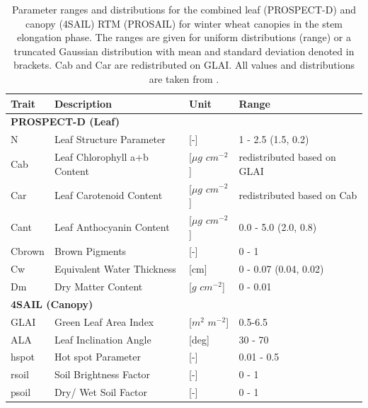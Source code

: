 \begin{table}[H]
\centering
\caption{Parameter ranges and distributions for the combined leaf (PROSPECT-D) and canopy (4SAIL) \gls{RTM} (PROSAIL) for winter wheat canopies in the stem elongation phase. The ranges are given for uniform distributions (range) or a truncated Gaussian distribution with mean and standard deviation denoted in brackets. Cab and Car are redistributed on \gls{GLAI}. All values and distributions are taken from \cite{graf_insights_2023}.}
\label{tab:drc-prosail-inputs}
\begin{tabular}{@{}lllllll@{}}
\toprule
  \textbf{Trait}     & \textbf{Description}         & \textbf{Unit}           & \multicolumn{4}{l}{\textbf{Range}}              \\ \midrule
\multicolumn{7}{l}{\textbf{PROSPECT-D (Leaf)}}                                                                \\
\midrule
N      & Leaf Structure Parameter     & {[}-{]}                 & \multicolumn{4}{l}{1 - 2.5 (1.5, 0.2)}          \\
Cab    & Leaf Chlorophyll a+b Content & {[}$\mu g$ $cm^{-2}${]} & \multicolumn{4}{l}{redistributed based on GLAI} \\
Car    & Leaf Carotenoid Content      & {[}$\mu g$ $cm^{-2}${]} & \multicolumn{4}{l}{redistributed based on Cab}  \\
Cant   & Leaf Anthocyanin Content     & {[}$\mu g$ $cm^{-2}${]} & \multicolumn{4}{l}{0.0 - 5.0 (2.0, 0.8)}        \\
Cbrown & Brown Pigments               & {[}-{]}                 & \multicolumn{4}{l}{0 - 1}                       \\
Cw     & Equivalent Water Thickness   & {[}cm{]}                & \multicolumn{4}{l}{0 - 0.07 (0.04, 0.02)}       \\
Dm     & Dry Matter Content           & {[}$g$ $cm^{-2}${]}     & \multicolumn{4}{l}{0 - 0.01}                    \\
\midrule
\multicolumn{7}{l}{\textbf{4SAIL (Canopy)}}                                                                     \\
\midrule
GLAI   & Green Leaf Area Index        & {[}$m^2$ $m^{-2}${]}    & \multicolumn{4}{l}{0.5-6.5}                         \\
ALA    & Leaf Inclination Angle       & {[}deg{]}               & \multicolumn{4}{l}{30 - 70}                     \\
hspot  & Hot spot Parameter           & {[}-{]}                 & \multicolumn{4}{l}{0.01 - 0.5}                  \\
rsoil  & Soil Brightness Factor       & {[}-{]}                 & \multicolumn{4}{l}{0 - 1}                       \\
psoil  & Dry/ Wet Soil Factor         & {[}-{]}                 & \multicolumn{4}{l}{0 - 1}                       \\ \bottomrule
\end{tabular}
\end{table}


